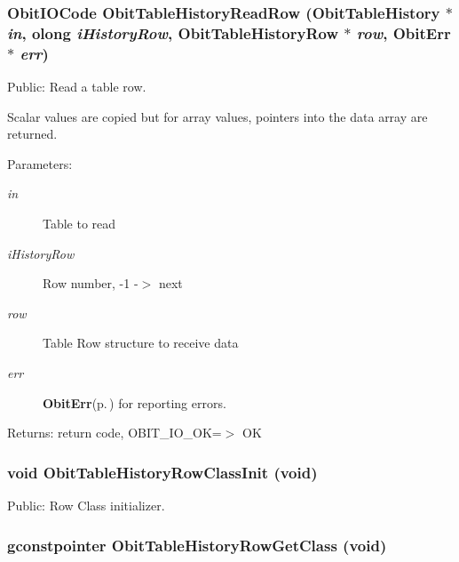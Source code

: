 \subsubsection{\setlength{\rightskip}{0pt plus 5cm}Obit\-IOCode Obit\-Table\-History\-Read\-Row ({\bf Obit\-Table\-History} $\ast$ {\em in}, {\bf olong} {\em i\-History\-Row}, {\bf Obit\-Table\-History\-Row} $\ast$ {\em row}, {\bf Obit\-Err} $\ast$ {\em err})}\label{ObitTableHistory_8h_a18}


Public: Read a table row. 

Scalar values are copied but for array values, pointers into the data array are returned. \begin{Desc}
\item[Parameters:]
\begin{description}
\item[{\em in}]Table to read \item[{\em i\-History\-Row}]Row number, -1 -$>$ next \item[{\em row}]Table Row structure to receive data \item[{\em err}]{\bf Obit\-Err}{\rm (p.\,\pageref{structObitErr})} for reporting errors. \end{description}
\end{Desc}
\begin{Desc}
\item[Returns:]return code, OBIT\_\-IO\_\-OK=$>$ OK \end{Desc}
\subsubsection{\setlength{\rightskip}{0pt plus 5cm}void Obit\-Table\-History\-Row\-Class\-Init (void)}\label{ObitTableHistory_8h_a7}


Public: Row Class initializer. 

\subsubsection{\setlength{\rightskip}{0pt plus 5cm}gconstpointer Obit\-Table\-History\-Row\-Get\-Class (void)}\label{ObitTableHistory_8h_a9}


